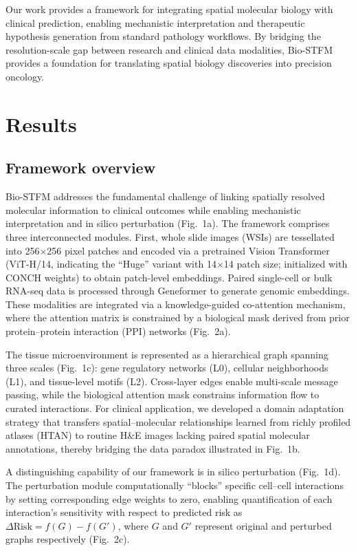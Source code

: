 \documentclass[pdflatex,sn-nature]{sn-jnl}%
\theoremstyle{thmstyleone}%
\theoremstyle{thmstyletwo}%
\theoremstyle{thmstylethree}%
\begin{document}
Our work provides a framework for integrating spatial molecular biology with clinical prediction, enabling mechanistic interpretation and therapeutic hypothesis generation from standard pathology workflows. By bridging the resolution-scale gap between research and clinical data modalities, Bio-STFM provides a foundation for translating spatial biology discoveries into precision oncology.

\section{Results}\label{sec2}

\subsection{Framework overview}\label{subsec1}

Bio-STFM addresses the fundamental challenge of linking spatially resolved molecular information to clinical outcomes while enabling mechanistic interpretation and in silico perturbation (Fig.~1a). The framework comprises three interconnected modules. First, whole slide images (WSIs) are tessellated into 256$\times$256 pixel patches and encoded via a pretrained Vision Transformer (ViT-H/14, indicating the ``Huge'' variant with 14$\times$14 patch size\cite{bib47}; initialized with CONCH weights\cite{bib22}) to obtain patch-level embeddings. Paired single-cell or bulk RNA-seq data is processed through Geneformer\cite{bib9} to generate genomic embeddings. These modalities are integrated via a knowledge-guided co-attention mechanism\cite{bib60}, where the attention matrix is constrained by a biological mask derived from prior protein--protein interaction (PPI) networks (Fig.~2a).

The tissue microenvironment is represented as a hierarchical graph spanning three scales (Fig.~1c): gene regulatory networks (L0), cellular neighborhoods (L1), and tissue-level motifs (L2)\cite{bib37,bib50}. Cross-layer edges enable multi-scale message passing, while the biological attention mask constrains information flow to curated interactions. For clinical application, we developed a domain adaptation strategy that transfers spatial--molecular relationships learned from richly profiled atlases (HTAN)\cite{bib11} to routine H\&E images lacking paired spatial molecular annotations, thereby bridging the data paradox illustrated in Fig.~1b.

A distinguishing capability of our framework is in silico perturbation (Fig.~1d). The perturbation module computationally ``blocks'' specific cell--cell interactions by setting corresponding edge weights to zero, enabling quantification of each interaction's sensitivity with respect to predicted risk as $\Delta\text{Risk} = f(G) - f(G')$, where $G$ and $G'$ represent original and perturbed graphs respectively (Fig.~2c).
\end{document}
